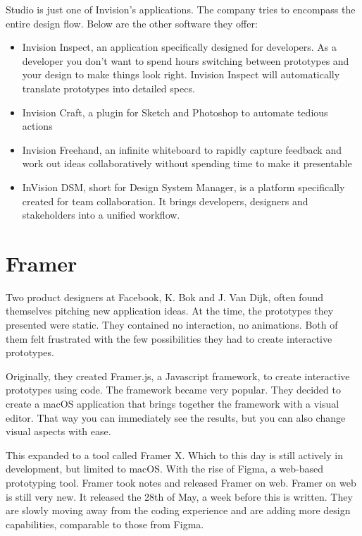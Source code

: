 Studio is just one of Invision's applications. The company tries to encompass the entire design flow. Below are the other software they offer:

\begin{itemize}
    \setlength\itemsep{-0.5em}    
    \item{Invision Inspect, an application specifically designed for developers. As a developer you don't want to spend hours switching between prototypes and your design to make things look right. Invision Inspect will automatically translate prototypes into detailed specs.}
    \item{Invision Craft, a plugin for Sketch and Photoshop to automate tedious actions }
    \item{Invision Freehand, an infinite whiteboard to rapidly capture feedback and work out ideas collaboratively without spending time to make it presentable}
    \item{InVision DSM, short for Design System Manager, is a platform specifically created for team collaboration. It brings developers, designers and stakeholders into a unified workflow.
    }
\end{itemize}

\section{Framer}
Two product designers at Facebook, K. Bok and J. Van Dijk, often found themselves pitching new application ideas. At the time, the prototypes they presented were static. They contained no interaction, no animations. Both of them felt frustrated with the few possibilities they had to create interactive prototypes.

Originally, they created Framer.js, a Javascript framework, to create interactive prototypes using code. The framework became very popular. They decided to create a macOS application that brings together the framework with a visual editor. That way you can immediately see the results, but you can also change visual aspects with ease.

This expanded to a tool called Framer X. Which to this day is still actively in development, but limited to macOS. With the rise of Figma, a web-based prototyping tool. Framer took notes and released Framer on web. Framer on web is still very new. It released the 28th of May, a week before this is written. They are slowly moving away from the coding experience and are adding more design capabilities, comparable to those from Figma.

